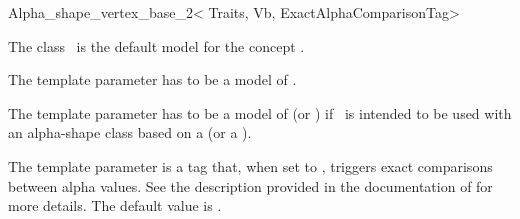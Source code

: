 \begin{ccRefClass}{Alpha_shape_vertex_base_2< Traits,
                                              Vb,
                                              ExactAlphaComparisonTag>}

\ccDefinition

The class \ccRefName\ is the default model for the concept
.


\ccParameters
The template parameter  has to be a model of .

The template parameter  has to be a model of  (or )
if \ccClassTemplateName\ is intended to be used with an alpha-shape class based on a 
 (or a ).

The template parameter  is a tag that, when set to
, triggers exact comparisons between alpha values. See the description
provided in the documentation of  for more details. The default value is .


\ccIsModel
{}


\ccInheritsFrom


\end{ccRefClass}
